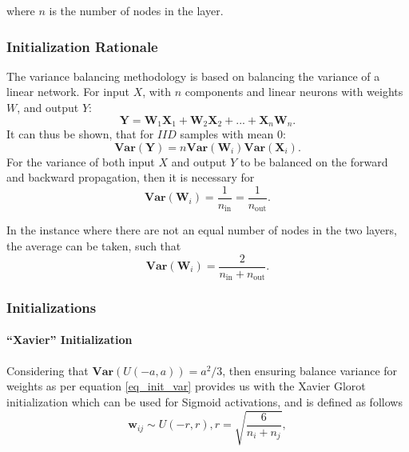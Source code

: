 \documentclass[a4paper,11pt,oneside]{article}
\newcommand{\Var}{\mathbf{Var}}
\theoremstyle{plain}
\theoremstyle{definition}
\begin{document}
	where $n$ is the number of nodes in the layer.
	
	\subsubsection{Initialization Rationale}
	
	The variance balancing methodology is based on balancing the variance of a linear network. For input $X$, with $n$ components and linear neurons with weights $W$, and output $Y$:
	\begin{equation}
	\mathbf{Y} = \mathbf{W}_1\mathbf{X}_1 + \mathbf{W}_2\mathbf{X}_2 + ... + \mathbf{X}_n\mathbf{W}_n .
	\end{equation}
	It can thus be shown, that for $IID$ samples with mean $0$:
	\begin{equation}
	\mathbf{\Var(Y)} = n{\Var}(\mathbf{W}_i){\Var}(\mathbf{X}_i) .
	\end{equation}
	For the variance of both input $X$ and output $Y$ to be balanced on the forward and backward propagation, then it is necessary for
	\begin{equation}
	{\Var}(\mathbf{W}_i) = \frac{1}{n_{\mathrm{in}}}= \frac{1}{n_{\mathrm{out}}} .
	\end{equation}
	
	In the instance where there are not an equal number of nodes in the two layers, the average can be taken, such that
	\begin{equation}\label{eq_init_var}
	{\Var}(\mathbf{W}_i) = \frac{2}{n_{\mathrm{in}} + n_{\mathrm{out}}} .
	\end{equation}
	
	\subsubsection{Initializations}
	
	\paragraph{``Xavier'' Initialization} Considering that  $\Var(U(-a, a)) = a^2/3$, then ensuring balance variance for weights as per equation \eqref{eq_init_var} provides us with the Xavier Glorot initialization \citep{Glorot} which can be used for Sigmoid activations, and is defined as follows
	\begin{equation}
	\mathbf{w}_{ij} \sim U(-r, r), r = \sqrt{\frac{6}{n_i + n_j}} ,
	\end{equation}
	
\end{document}

